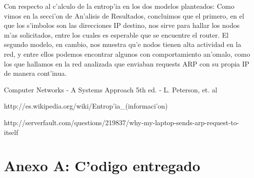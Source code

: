 \documentclass[a4paper,10pt]{article}
\begin{document}
Con respecto al c'alculo de la entrop'ia en los dos modelos planteados: Como vimos en la secci'on de An'alisis de Resultados, concluimos que el primero, en el que los s'imbolos son las direcciones IP destino, nos sirve para hallar los nodos m'as solicitados, entre los cuales es esperable que se encuentre el router. El segundo modelo, en cambio, nos muestra qu'e nodos tienen alta actividad en la red, y entre ellos podemos encontrar algunos con comportamiento an'omalo, como los que hallamos en la red analizada que enviaban requests ARP con su propia IP de manera cont'inua.

\begin{thebibliography}{99}
	\item Computer Networks - A Systems Approach 5th ed. - L. Peterson, et. al
	\item http://es.wikipedia.org/wiki/Entrop'ia\_(informaci'on)
	\item http://serverfault.com/questions/219837/why-my-laptop-sends-arp-request-to-itself 
\end{thebibliography}

\newpage

\section{Anexo A: C'odigo entregado}
\end{document}
